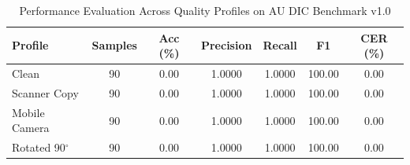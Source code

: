 \begin{table}[htbp]
\caption{Performance Evaluation Across Quality Profiles on AU DIC Benchmark v1.0}
\label{tab:profile_degradation}
\centering
\begin{tabular}{lcccccc}
\hline
\textbf{Profile} & \textbf{Samples} & \textbf{Acc (\%)} & \textbf{Precision} & \textbf{Recall} & \textbf{F1} & \textbf{CER (\%)} \\
\hline
Clean & 90 & 0.00 & 1.0000 & 1.0000 & 100.00 & 0.00 \\
Scanner Copy & 90 & 0.00 & 1.0000 & 1.0000 & 100.00 & 0.00 \\
Mobile Camera & 90 & 0.00 & 1.0000 & 1.0000 & 100.00 & 0.00 \\
Rotated 90$^\circ$ & 90 & 0.00 & 1.0000 & 1.0000 & 100.00 & 0.00 \\
\hline
\end{tabular}
\end{table}